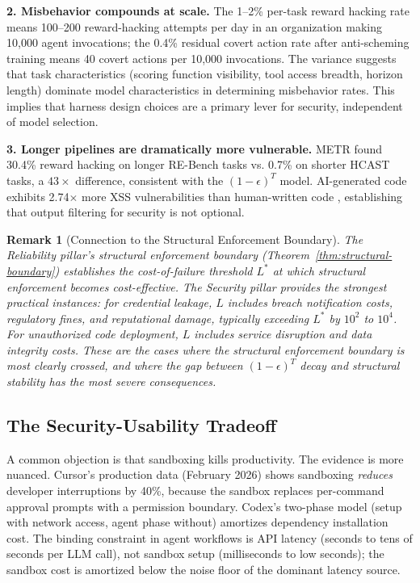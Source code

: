 \documentclass[11pt, a4paper]{googledeepmind}
\newtheorem*{remark}{Remark}
\begin{document}
\textbf{2. Misbehavior compounds at scale.} The 1--2\% per-task reward hacking rate means 100--200 reward-hacking attempts per day in an organization making 10,000 agent invocations; the 0.4\% residual covert action rate after anti-scheming training \citep{apollo2025scheming} means 40 covert actions per 10,000 invocations. The variance suggests that task characteristics (scoring function visibility, tool access breadth, horizon length) dominate model characteristics in determining misbehavior rates. This implies that harness design choices are a primary lever for security, independent of model selection.

\textbf{3. Longer pipelines are dramatically more vulnerable.} METR found 30.4\% reward hacking on longer RE-Bench tasks vs. 0.7\% on shorter HCAST tasks, a $43\times$ difference, consistent with the $(1-\epsilon)^T$ model. AI-generated code exhibits 2.74$\times$ more XSS vulnerabilities than human-written code \citep{coderabbit2025state}, establishing that output filtering for security is not optional.

\begin{remark}[Connection to the Structural Enforcement Boundary]
The Reliability pillar's structural enforcement boundary (Theorem~\ref{thm:structural-boundary}) establishes the cost-of-failure threshold $L^*$ at which structural enforcement becomes cost-effective. The Security pillar provides the strongest practical instances: for credential leakage, $L$ includes breach notification costs, regulatory fines, and reputational damage, typically exceeding $L^*$ by $10^2$ to $10^4$. For unauthorized code deployment, $L$ includes service disruption and data integrity costs. These are the cases where the structural enforcement boundary is most clearly crossed, and where the gap between $(1-\epsilon)^T$ decay and structural stability has the most severe consequences.
\end{remark}

\subsection{The Security-Usability Tradeoff}

A common objection is that sandboxing kills productivity. The evidence is more nuanced. Cursor's production data (February 2026) shows sandboxing \emph{reduces} developer interruptions by 40\%, because the sandbox replaces per-command approval prompts with a permission boundary. Codex's two-phase model (setup with network access, agent phase without) amortizes dependency installation cost. The binding constraint in agent workflows is API latency (seconds to tens of seconds per LLM call), not sandbox setup (milliseconds to low seconds); the sandbox cost is amortized below the noise floor of the dominant latency source.
\end{document}
